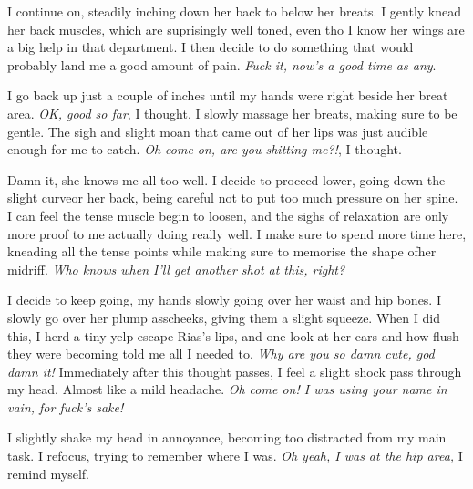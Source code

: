 \documentclass{article}
\begin{document}
I continue on, steadily inching down her back to below her breats. I gently knead her back muscles, which are suprisingly well toned, even tho I know her wings are a big help in that department. I then decide to do something that would probably land me a good amount of pain. \emph{Fuck it, now's a good time as any}.

I go back up just a couple of inches until my hands were right beside her breat area. \emph{OK, good so far}, I thought. I slowly massage her breats, making sure to be gentle. The sigh and slight moan that came out of her lips was just audible enough for me to catch. \emph{Oh come on, are you shitting me?!}, I thought.

Damn it, she knows me all too well. I decide to proceed lower, going down the slight curveor her back, being careful not to put too much pressure on her spine. I can feel the tense muscle begin to loosen, and the sighs of relaxation are only more proof to me actually doing really well. I make sure to spend more time here, kneading all the tense points while making sure to memorise the shape ofher midriff. \emph{Who knows when I'll get another shot at this, right?}

I decide to keep going, my hands slowly going over her waist and hip bones. I slowly go over her plump asscheeks, giving them a slight squeeze. When I did this, I herd a tiny yelp escape Rias's lips, and one look at her ears and how flush they were becoming told me all I needed to. \emph{Why are you so damn cute, god damn it!} Immediately after this thought passes, I feel a slight shock pass through my head. Almost like a mild headache. \emph{Oh come on! I was using your name in vain, for fuck's sake!}

I slightly shake my head in annoyance, becoming too distracted from my main task. I refocus, trying to remember where I was. \emph{Oh yeah, I was at the hip area,} I remind myself. 
\end{document}
